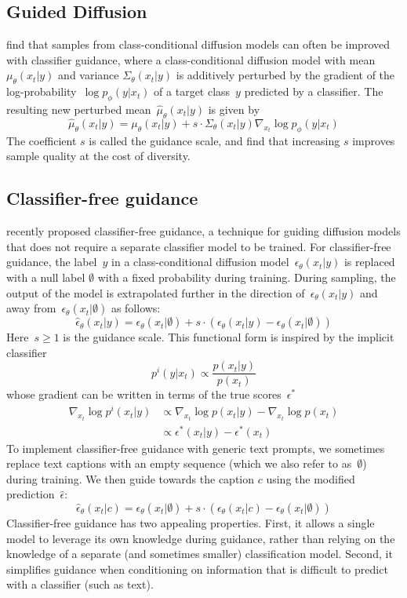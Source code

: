 \documentclass{article}
\begin{document}
\subsection{Guided Diffusion}
\label{sec:guideddiffusion}

\citet{sotapaper} find that samples from class-conditional diffusion models can often be improved with classifier guidance, where a class-conditional diffusion model with mean~$\mu_{\theta}(x_t|y)$ and variance $\Sigma_{\theta}(x_t|y)$ is additively perturbed by the gradient of the log-probability~$\log p_{\phi}(y|x_t)$ of a target class~$y$ predicted by a classifier. The resulting new perturbed mean~$\hat{\mu}_{\theta}(x_t|y)$ is given by 
$$\hat{\mu}_{\theta}(x_t|y) = \mu_{\theta}(x_t|y) + s \cdot \Sigma_{\theta}(x_t|y) \nabla_{x_t} \log p_{\phi}(y|x_t)$$
The coefficient $s$ is called the guidance scale, and \citet{sotapaper} find that increasing $s$ improves sample quality at the cost of diversity.

\subsection{Classifier-free guidance}
\label{sec:uncondguidance}
\citet{uncond} recently proposed classifier-free guidance, a technique for guiding diffusion models that does not require a separate classifier model to be trained. For classifier-free guidance, the label~$y$ in a class-conditional diffusion model~$\epsilon_{\theta}(x_t|y)$ is replaced with a null label $\emptyset$ with a fixed probability during training. During sampling, the output of the model is extrapolated further in the direction of~$\epsilon_{\theta}(x_t|y)$ and away from~$\epsilon_{\theta}(x_t|\emptyset)$ as follows:
$$\hat{\epsilon}_{\theta}(x_t|y) = \epsilon_{\theta}(x_t|\emptyset) + s \cdot (\epsilon_{\theta}(x_t|y) - \epsilon_{\theta}(x_t|\emptyset))$$
Here~$s \ge 1$ is the guidance scale. This functional form is inspired by the implicit classifier $$p^{i}(y|x_t) \propto \frac{p(x_t|y)}{p(x_t)}$$ whose gradient can be written in terms of the true scores~$\epsilon^{*}$ 
\begin{align*}
\nabla_{x_t} \log p^{i}(x_t|y) &\propto \nabla_{x_t} \log p(x_t|y) - \nabla_{x_t} \log p(x_t) \\
&\propto \epsilon^{*}(x_t|y) - \epsilon^{*}(x_t)    
\end{align*}
To implement classifier-free guidance with generic text prompts, we sometimes replace text captions with an empty sequence (which we also refer to as~$\emptyset$) during training. We then guide towards the caption $c$ using the modified prediction~$\hat{\epsilon}$:
$$\hat{\epsilon}_{\theta}(x_t|c) = \epsilon_{\theta}(x_t|\emptyset) + s \cdot (\epsilon_{\theta}(x_t|c) - \epsilon_{\theta}(x_t|\emptyset))$$
Classifier-free guidance has two appealing properties. First, it allows a single model to leverage its own knowledge during guidance, rather than relying on the knowledge of a separate (and sometimes smaller) classification model. Second, it simplifies guidance when conditioning on information that is difficult to predict with a classifier (such as text).
\end{document}
